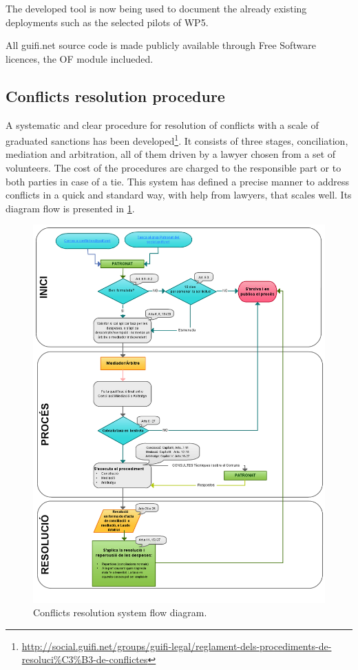 The developed tool is now being used to document the already existing deployments such as the selected pilots of WP5.

All guifi.net source code is made publicly available through Free Software licences, the OF module inclueded.


\subsection{Conflicts resolution procedure}

A systematic and clear procedure for resolution of conflicts with a scale of graduated sanctions has been developed\footnote{\url{http://social.guifi.net/groups/guifi-legal/reglament-dels-procediments-de-resoluci\%C3\%B3-de-conflictes}}. It consists of three stages, conciliation, mediation and arbitration, all of them driven by a lawyer chosen from a set of volunteers. The cost of the procedures are charged to the responsible part or to both parties in case of a tie. This system has defined a precise manner to address conflicts in a quick and standard way, with help from lawyers, that scales well. Its diagram flow is presented in \figurename \ref{fig:conflicts}.

\begin{figure}[H]
  \centering
  \includegraphics[width=0.90\linewidth]{sect2/figures/Resolucio_de_conflictes.png}
  \caption[Conflicts resolution system flow diagram.]{Conflicts resolution system flow diagram.}
  \label{fig:conflicts}
\end{figure}


